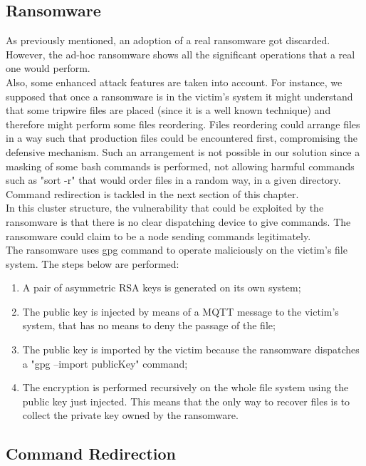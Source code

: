 \subsection{Ransomware}

As previously mentioned, an adoption of a real ransomware got discarded. However, the ad-hoc ransomware shows all the significant operations that a real one would perform.\\
Also, some enhanced attack features are taken into account. For instance, we supposed that once a ransomware is in the victim's system it might understand that some tripwire files are placed (since it is a well known technique) and therefore might perform some files reordering. Files reordering could arrange files in a way such that production files could be encountered first, compromising the defensive mechanism. Such an arrangement is not possible in our solution since a masking of some bash commands is performed, not allowing harmful commands such as "sort -r" that would order files in a random way, in a given directory. Command redirection is tackled in the next section of this chapter.\\
In this cluster structure, the vulnerability that could be exploited by the ransomware is that there is no clear dispatching device to give commands. The ransomware could claim to be a node sending commands legitimately.\\
The ransomware uses gpg command to operate maliciously on the victim's file system. The steps below are performed:

\begin{enumerate}
  \item A pair of asymmetric RSA keys is generated on its own system;
  \item The public key is injected by means of a MQTT message to the victim's system, that has no means to deny the passage of the file;
  \item The public key is imported by the victim because the ransomware dispatches a "gpg --import publicKey" command;
  \item The encryption is performed recursively on the whole file system using the public key just injected. This means that the only way to recover files is to collect the private key owned by the ransomware.
\end{enumerate}


\subsection{Command Redirection}
